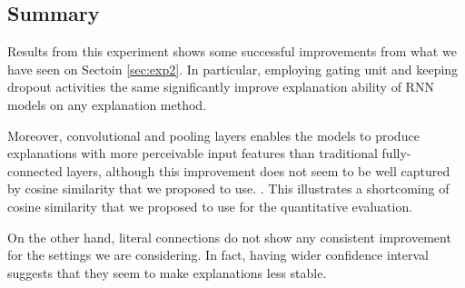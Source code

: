 
\clearpage

\subsection{Summary}
Results from this experiment shows some successful improvements from what we have seen on Sectoin \ref{sec:exp2}. In particular, employing gating unit and keeping dropout activities the same significantly improve explanation ability of RNN models on any explanation method.  

Moreover, convolutional and pooling layers enables the models to produce explanations with more perceivable input features than traditional fully-connected layers, although this improvement does not seem to be well captured by cosine similarity that we proposed to use. . This illustrates  a shortcoming of cosine similarity that we proposed to use for the quantitative evaluation.

On the other hand, literal connections do not show any consistent improvement for the settings we are considering. In fact, having wider confidence interval suggests that they seem to make explanations less stable.
